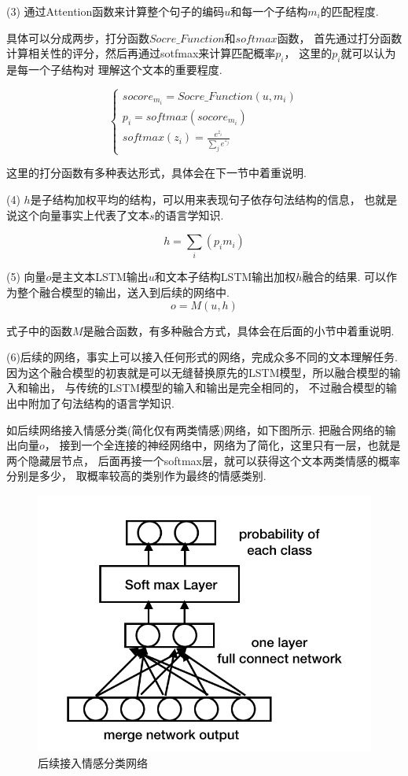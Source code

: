 \documentclass[bachelor,adobefonts]{jnuthesis}
\begin{document}
(3)
通过Attention函数来计算整个句子的编码$u$和每一个子结构$m_{i}$的匹配程度.

具体可以分成两步，打分函数$Socre\_Function$和$softmax$函数，
首先通过打分函数计算相关性的评分，然后再通过sotfmax来计算匹配概率$p_{i}$，
这里的$p_{i}$就可以认为是每一个子结构对
理解这个文本的重要程度.

\begin{equation}
  \left\{
    \begin{array}{l}
     socore_{m_{i}} = Socre\_Function(u,m_{i}) \\ 
     p_{i} = softmax(socore_{m_{i}}) \\ 
     softmax(z_{i}) = \frac{e^{z_{i}}}{\sum_{j} e^{z_{j}}}
    \end{array}
  \right.
\end{equation}

这里的打分函数有多种表达形式，具体会在下一节中着重说明.

(4)
$h$是子结构加权平均的结构，可以用来表现句子依存句法结构的信息，
也就是说这个向量事实上代表了文本$s$的语言学知识.

\begin{equation}
  h = \sum_{i}(p_{i}m_{i})
\end{equation}

(5)
向量$o$是主文本LSTM输出$u$和文本子结构LSTM输出加权$h$融合的结果.
可以作为整个融合模型的输出，送入到后续的网络中.
\begin{equation}
  o = M(u,h)
\end{equation}

式子中的函数$M$是融合函数，有多种融合方式，具体会在后面的小节中着重说明.

(6)后续的网络，事实上可以接入任何形式的网络，完成众多不同的文本理解任务.
因为这个融合模型的初衷就是可以无缝替换原先的LSTM模型，所以融合模型的输入和输出，
与传统的LSTM模型的输入和输出是完全相同的，
不过融合模型的输出中附加了句法结构的语言学知识.

如后续网络接入情感分类(简化仅有两类情感)网络，如下图所示.
把融合网络的输出向量$o$，
接到一个全连接的神经网络中，网络为了简化，这里只有一层，也就是两个隐藏层节点，
后面再接一个softmax层，就可以获得这个文本两类情感的概率分别是多少，
取概率较高的类别作为最终的情感类别.
\begin{figure}[h!]
  \centering
  \includegraphics[width=0.5\linewidth]{erfenlei.png}
  \caption{后续接入情感分类网络}
\end{figure}
\end{document}
